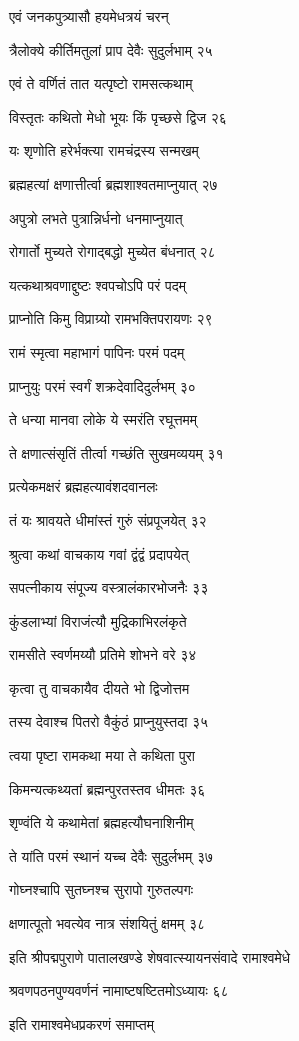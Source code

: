 एवं जनकपुत्र्यासौ हयमेधत्रयं चरन्

त्रैलोक्ये कीर्तिमतुलां प्राप देवैः सुदुर्लभाम् २५

एवं ते वर्णितं तात यत्पृष्टो रामसत्कथाम्

विस्तृतः कथितो मेधो भूयः किं पृच्छसे द्विज २६

यः शृणोति हरेर्भक्त्या रामचंद्रस्य सन्मखम्

ब्रह्महत्यां क्षणात्तीर्त्वा ब्रह्मशाश्वतमाप्नुयात् २७

अपुत्रो लभते पुत्रान्निर्धनो धनमाप्नुयात्

रोगार्तो मुच्यते रोगाद्बद्धो मुच्येत बंधनात् २८

यत्कथाश्रवणाद्दुष्टः श्वपचोऽपि परं पदम्

प्राप्नोति किमु विप्राग्र्यो रामभक्तिपरायणः २९

रामं स्मृत्वा महाभागं पापिनः परमं पदम्

प्राप्नुयुः परमं स्वर्गं शक्रदेवादिदुर्लभम् ३०

ते धन्या मानवा लोके ये स्मरंति रघूत्तमम्

ते क्षणात्संसृतिं तीर्त्वा गच्छंति सुखमव्ययम् ३१

प्रत्येकमक्षरं ब्रह्महत्यावंशदवानलः

तं यः श्रावयते धीमांस्तं गुरुं संप्रपूजयेत् ३२

श्रुत्वा कथां वाचकाय गवां द्वंद्वं प्रदापयेत्

सपत्नीकाय संपूज्य वस्त्रालंकारभोजनैः ३३

कुंडलाभ्यां विराजंत्यौ मुद्रिकाभिरलंकृते

रामसीते स्वर्णमय्यौ प्रतिमे शोभने वरे ३४

कृत्वा तु वाचकायैव दीयते भो द्विजोत्तम

तस्य देवाश्च पितरो वैकुंठं प्राप्नुयुस्तदा ३५

त्वया पृष्टा रामकथा मया ते कथिता पुरा

किमन्यत्कथ्यतां ब्रह्मन्पुरतस्तव धीमतः ३६

शृण्वंति ये कथामेतां ब्रह्महत्यौघनाशिनीम्

ते यांति परमं स्थानं यच्च देवैः सुदुर्लभम् ३७

गोघ्नश्चापि सुतघ्नश्च सुरापो गुरुतल्पगः

क्षणात्पूतो भवत्येव नात्र संशयितुं क्षमम् ३८

इति श्रीपद्मपुराणे पातालखण्डे शेषवात्स्यायनसंवादे रामाश्वमेधे

श्रवणपठनपुण्यवर्णनं नामाष्टषष्टितमोऽध्यायः ६८

इति रामाश्वमेधप्रकरणं समाप्तम्


